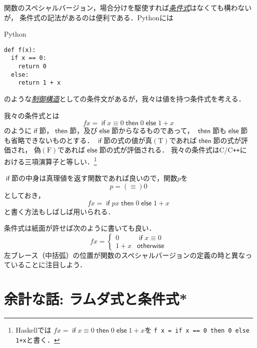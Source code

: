 \documentclass[a5paper,draft]{jsbook}
\newcommand{\programminglanguage}[1]{\textsf{#1}}
\newcommand{\clang}{\programminglanguage{C}}
\newcommand{\cxx}{\programminglanguage{C}\texttt{++}}
\newcommand{\haskell}{\programminglanguage{Haskell}}
\newcommand{\python}{\programminglanguage{Python}}
\newcommand{\keyword}[1]{{\underline{\emph{#1}}}}
\newcommand{\code}[1]{\texttt{#1}}
\newenvironment{pythoncode}{\begin{itembox}[r]{\python}}{\end{itembox}}
\newcommand{\mathConstant}[1]{\mathrm{#1}} %
\newcommand{\mathTrue}{\mathConstant{T}}
\newcommand{\mathFalse}{\mathConstant{F}}
\newcommand{\mathKeyword}[1]{\operatorname{\textsf{#1}}}
\newcommand{\mathIf}{\mathKeyword{if}}
\newcommand{\mathThen}{\mathKeyword{then}}
\newcommand{\mathElse}{\mathKeyword{else}}
\newcommand{\mathOtherwise}{\mathKeyword{otherwise}}
\begin{document}
関数のスペシャルバージョン，場合分けを駆使すれば\keyword{条件式}はなくても構わないが，
条件式の記法があるのは便利である．\python には
\begin{pythoncode}
\begin{verbatim}
def f(x):
  if x == 0:
    return 0
  else:
    return 1 + x
\end{verbatim}
\end{pythoncode}
のような\keyword{制御構造}としての条件文があるが，我々は値を持つ条件式を考える．

我々の条件式とは
\begin{equation}
fx=\mathIf x\equiv0\mathThen0\mathElse1+x
\end{equation}
のように$\mathIf$節，$\mathThen$節，及び$\mathElse$節からなるものであって，
$\mathThen$節も$\mathElse$節も省略できないものとする．
$\mathIf$節の式の値が真$(\mathTrue)$であれば$\mathThen$節の式が評価され，
偽$(\mathFalse)$であれば$\mathElse$節の式が評価される．
我々の条件式は\clang/\cxx における三項演算子と等しい．\footnote{\haskell では
$fx=\mathIf x\equiv0\mathThen0\mathElse1+x$を
\code{f x = if x == 0 then 0 else 1+x}と書く．}

$\mathIf$節の中身は真理値を返す関数であれば良いので，関数$p$を
\begin{equation}
p=(\equiv)0
\end{equation}
としておき，
\begin{equation}
fx=\mathIf px\mathThen0\mathElse1+x
\end{equation}
と書く方法もしばしば用いられる．

条件式は紙面が許せば次のように書いても良い．
\begin{equation}
fx=\begin{cases}
0&\mathIf x\equiv0\\
1+x&\mathOtherwise
\end{cases}
\end{equation}
左ブレース（中括弧）の位置が関数のスペシャルバージョンの定義の時と異なっていることに注目しよう．

\section{余計な話: ラムダ式と条件式*}
\end{document}
